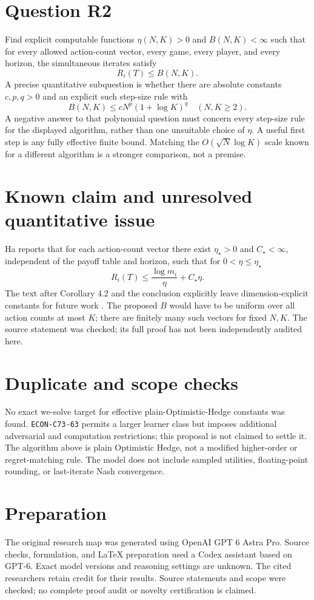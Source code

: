 \documentclass[11pt]{article}
\begin{document}
\section*{Question R2}
Find explicit computable functions $\eta(N,K)>0$ and $B(N,K)<\infty$
such that for every allowed action-count vector, every game, every
player, and every horizon, the simultaneous iterates satisfy
\[
 R_i(T)\leq B(N,K).
\]
A precise quantitative subquestion is whether there are absolute
constants $c,p,q>0$ and an explicit such step-size rule with
\[
 B(N,K)\leq cN^p(1+\log K)^q \quad(N,K\geq2).
\]
A negative answer to that polynomial question must concern every
step-size rule for the displayed algorithm, rather than one unsuitable
choice of $\eta$. A useful first step is any fully effective finite
bound. Matching the $O(\sqrt N\log K)$ scale known for a different
algorithm \cite[Theorem 2.4]{S1} is a stronger comparison, not a premise.

\section*{Known claim and unresolved quantitative issue}
Ha reports that for each action-count vector there exist
$\eta_\star>0$ and $C_\star<\infty$, independent of the payoff table
and horizon, such that for $0<\eta\leq\eta_\star$
\[
 R_i(T)\leq\frac{\log m_i}{\eta}+C_\star\eta.
\]
The text after Corollary 4.2 and the conclusion explicitly leave
dimension-explicit constants for future work \cite[Theorem 4.1]{ha}.
The proposed $B$ would have to be uniform over all action counts at most
$K$; there are finitely many such vectors for fixed $N,K$.
The source statement was checked; its full proof has not been
independently audited here.

\section*{Duplicate and scope checks}
No exact we-solve target for effective plain-Optimistic-Hedge constants
was found. \texttt{ECON-C73-63} permits a larger learner class but imposes
additional adversarial and computation restrictions; this proposal is
not claimed to settle it. The algorithm above is plain Optimistic
Hedge, not a modified higher-order or regret-matching rule. The model
does not include sampled utilities, floating-point rounding, or
last-iterate Nash convergence.

\section*{Preparation}
The original research map was generated using OpenAI GPT 6 Astra Pro.
Source checks, formulation, and LaTeX preparation used a Codex assistant
based on GPT-6. Exact model versions and reasoning settings are unknown.
The cited researchers retain credit for their results. Source statements
and scope were checked; no complete proof audit or novelty certification
is claimed.
\end{document}
